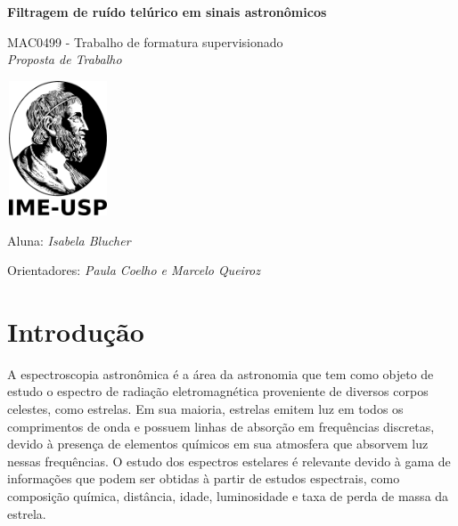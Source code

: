 \documentclass[11pt,twoside,a4paper]{article}
\begin{document}
\begin{center}
  \vspace*{3cm}
  
  \Huge
  \textbf{Filtragem de ruído telúrico em sinais astronômicos}

  \vspace{2.5cm}
  \LARGE
  MAC0499 - Trabalho de formatura supervisionado\\
  \vspace{0.3cm}
  \LARGE
  \textit{Proposta de Trabalho}

  
  \vspace{4.3cm}
  \includegraphics[height=4cm,width=3cm]{ime.png}
  \vspace{2cm}
  
  Aluna: \textit{Isabela Blucher}
  
  
  Orientadores: \textit{Paula Coelho e Marcelo Queiroz}
  
  \vspace{0.8cm}
  
  \Large
  
\end{center}


\newpage
\tableofcontents
\newpage
\section{Introdução}
\doublespacing


A espectroscopia astronômica é a área da astronomia que tem como objeto de estudo o espectro de radiação eletromagnética proveniente de diversos corpos celestes, como estrelas. Em sua maioria, estrelas emitem luz em todos os comprimentos de onda e possuem linhas de absorção em frequências discretas, devido à presença de elementos químicos em sua atmosfera que absorvem luz nessas frequências. O estudo dos espectros estelares é relevante devido à gama de informações que podem ser obtidas à partir de estudos espectrais, como composição química, distância, idade, luminosidade e taxa de perda de massa da estrela\cite{astro_wiki}.
\end{document}
